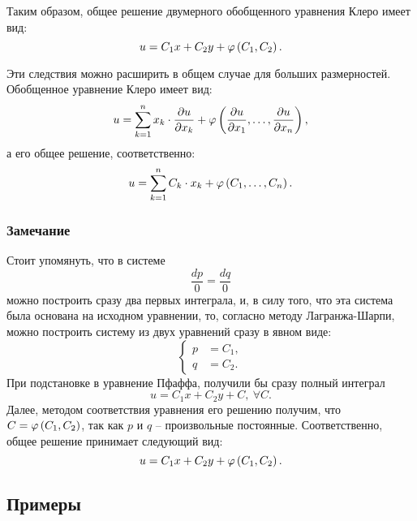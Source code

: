	Таким образом, общее решение двумерного обобщенного уравнения Клеро имеет вид:
	\[ u = C_1 x + C_2 y + \varphi \left( C_1, C_2 \right). \]

	Эти следствия можно расширить в общем случае для больших размерностей. Обобщенное уравнение Клеро имеет вид:
	\[ u = \sum_{k = 1}^{n} x_k \cdot \dfrac{\partial u}{\partial x_k} + \varphi \left( \dfrac{\partial u}{\partial x_1}, \dots, \dfrac{\partial u}{\partial x_n} \right), \]
	а его общее решение, соответственно:
	\[ u = \sum_{k = 1}^{n} C_k \cdot x_k + \varphi \left( C_1, \dots, C_n \right). \]

	\subsubsection*{Замечание}
		Стоит упомянуть, что в системе
		\[ \frac{dp}{0} = \frac{dq}{0} \]
		можно построить сразу два первых интеграла, и, в силу того, что эта система была основана на исходном уравнении, то, согласно методу Лагранжа-Шарпи, можно построить систему из двух уравнений сразу в явном виде:
		\[ \left\lbrace \begin{split} p &= C_1, \\ q &= C_2. \end{split} \right. \]
		При подстановке в уравнение Пфаффа, получили бы сразу полный интеграл
		\[ u = C_1 x + C_2 y + C, ~ \forall C. \]
		Далее, методом соответствия уравнения его решению получим, что $C = \varphi \left( C_1, C_2 \right)$, так как $p$ и $q$ -- произвольные постоянные. Соответственно, общее решение принимает следующий вид:
		\[ u = C_1 x + C_2 y + \varphi \left( C_1, C_2 \right). \]


	\subsection{Примеры}

